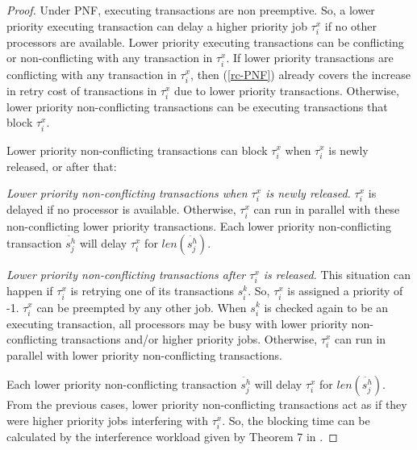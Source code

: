 \documentclass[twocolumn]{article}
\newtheorem{proof}{Proof}
\begin{document}
\begin{proof}\normalfont
Under PNF, executing transactions are non preemptive. So, a lower priority executing transaction can delay a higher priority job $\tau_i^x$ if no other processors are available. Lower priority executing transactions can be conflicting or non-conflicting with any transaction in $\tau_{i}^{x}$. If lower priority transactions are conflicting with any transaction in $\tau_i^x$, then (\ref{rc-PNF}) already covers the increase in retry cost of transactions in $\tau_i^x$ due to lower priority transactions. Otherwise, lower priority non-conflicting transactions can be executing transactions that block $\tau_i^x$.

Lower priority non-conflicting transactions can block $\tau_i^x$ when $\tau_i^x$ is newly released, or after that:

\emph{Lower priority non-conflicting transactions when $\tau_i^x$ is newly released.} $\tau_i^x$ is delayed if no processor is available. Otherwise, $\tau_i^x$ can run in parallel with these non-conflicting lower priority transactions. Each lower priority non-conflicting transaction $\ddot{s_j^h}$ will delay $\tau_i^x$ for $len(\ddot{s_j^h})$.

\emph{Lower priority non-conflicting transactions after $\tau_i^x$ is released.} This situation can happen if $\tau_i^x$ is retrying one of its transactions $s_i^k$. So, $\tau_i^x$ is assigned a priority of -1. $\tau_i^x$ can be preempted by any other job. When $s_i^k$ is checked again to be an executing transaction, all processors may be busy with lower priority non-conflicting transactions and/or higher priority jobs. Otherwise, $\tau_i^x$ can run in parallel with  lower priority non-conflicting transactions.

Each lower priority non-conflicting transaction $\ddot{s_j^h}$ will delay $\tau_i^x$ for $len(\ddot{s_j^h})$. From the previous cases, lower priority non-conflicting transactions act as if they were higher priority jobs interfering with $\tau_{i}^{x}$. So, the blocking time can be calculated by the interference workload given by Theorem 7 in \cite{key-2}. 
\end{proof}
\end{document}
